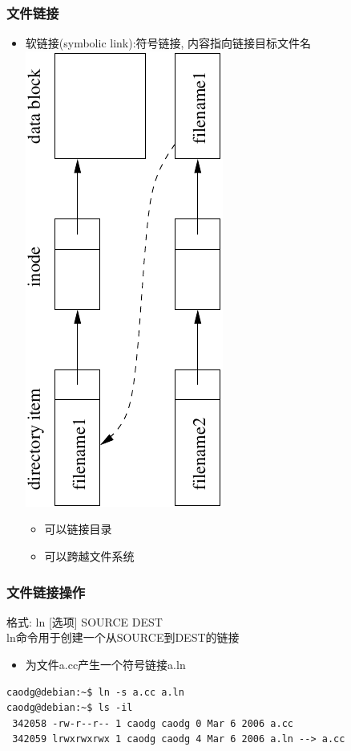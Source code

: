 \documentclass[compress]{beamer}
\begin{document}
\begin{frame}
\frametitle{文件链接}

\begin{itemize}
\item 软链接(symbolic link):符号链接, 内容指向链接目标文件名
\includegraphics[scale=1.0,angle=-90]{lns.pdf}
\begin{itemize}
\item 可以链接目录
\item 可以跨越文件系统
\end{itemize}
\end{itemize}


\end{frame}

\begin{frame}[containsverbatim]
\frametitle{文件链接操作}

格式: \alert{ln} [选项] SOURCE DEST \\
\alert{ln}命令用于创建一个从SOURCE到DEST的链接

\begin{itemize}
\item 为文件a.cc产生一个符号链接a.ln\\[1ex]
\end{itemize}
\begin{Verbatim}
caodg@debian:~$ ln -s a.cc a.ln
caodg@debian:~$ ls -il
 342058 -rw-r--r-- 1 caodg caodg 0 Mar 6 2006 a.cc 
 342059 lrwxrwxrwx 1 caodg caodg 4 Mar 6 2006 a.ln --> a.cc
\end{Verbatim}
 
\end{frame}
\end{document}
